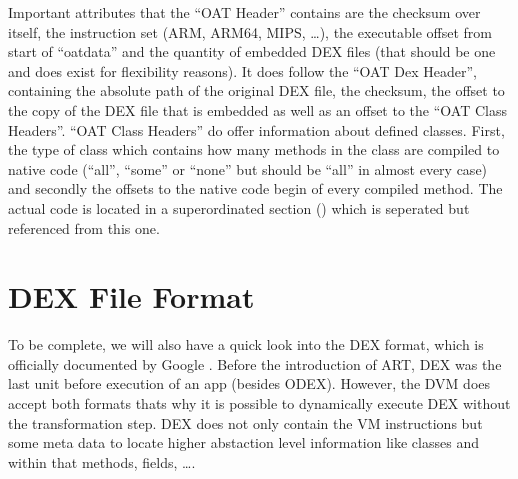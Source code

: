 Important attributes that the ``OAT Header'' contains are the
checksum over itself,
the instruction set (ARM, ARM64, MIPS, \ldots), the executable
offset from start of ``oatdata'' and the quantity of embedded
DEX files (that should be one and does exist for flexibility
reasons). It does follow the ``OAT Dex Header'', containing
the absolute path of the original DEX file, the checksum, the
offset to the copy of the DEX file that is embedded as well as
an offset to the ``OAT Class Headers''. ``OAT Class Headers''
do offer information about defined classes. First, the type
of class which contains how many methods in the class
are compiled to native code (``all'', ``some'' or ``none'' but
should be ``all'' in almost every case) and secondly
the offsets to the native code begin of every compiled method.
The actual code is located in a superordinated section
() which is seperated but referenced from this one.

\section{DEX File Format}
\label{section:dex_file_format}
To be complete, we will also have a quick look into the DEX format,
which is officially documented by Google \parencite{dex}.
Before the introduction of ART, DEX was the last unit before
execution of an app (besides ODEX). However, the DVM does accept
both formats thats why it is possible to dynamically execute
DEX without the transformation step. DEX does not only contain
the VM instructions but some meta data to locate
higher abstaction level information like classes and within that
methods, fields, \ldots.

